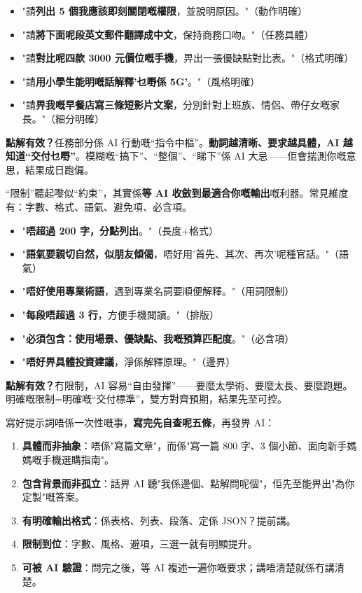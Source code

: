 \begin{itemize}
  \item "請\textbf{列出 5 個我應該即刻關閉嘅權限}，並說明原因。"（動作明確）
  \item "請\textbf{將下面呢段英文郵件翻譯成中文}，保持商務口吻。"（任務具體）
  \item "請\textbf{對比呢四款 3000 元價位嘅手機}，畀出一張優缺點對比表。"（格式明確）
  \item "請\textbf{用小學生能明嘅話解釋'乜嘢係 5G'}。"（風格明確）
  \item "請\textbf{畀我嘅早餐店寫三條短影片文案}，分別針對上班族、情侶、帶仔女嘅家長。"（細分明確）
\end{itemize}

\textbf{點解有效？}任務部分係 AI 行動嘅“指令中樞”。\textbf{動詞越清晰、要求越具體，AI 越知道“交付乜嘢”}。模糊嘅“搞下”、“整個”、“睇下”係 AI 大忌——佢會揣測你嘅意思，結果成日跑偏。


“限制”聽起嚟似“約束”，其實係\textbf{等 AI 收斂到最適合你嘅輸出}嘅利器。常見維度有：字數、格式、語氣、避免項、必含項。


\begin{itemize}
  \item "\textbf{唔超過 200 字，分點列出}。"（長度+格式）
  \item "\textbf{語氣要親切自然，似朋友傾偈}，唔好用'首先、其次、再次'呢種官話。"（語氣）
  \item "\textbf{唔好使用專業術語}，遇到專業名詞要順便解釋。"（用詞限制）
  \item "\textbf{每段唔超過 3 行}，方便手機閲讀。"（排版）
  \item "\textbf{必須包含：使用場景、優缺點、我嘅預算匹配度}。"（必含項）
  \item "\textbf{唔好畀具體投資建議}，淨係解釋原理。"（邊界）
\end{itemize}

\textbf{點解有效？}冇限制，AI 容易“自由發揮”——要麼太學術、要麼太長、要麼跑題。明確嘅限制=明確嘅“交付標準”，雙方對齊預期，結果先至可控。


寫好提示詞唔係一次性嘅事，\textbf{寫完先自查呢五條}，再發畀 AI：

\begin{enumerate}
  \item \textbf{具體而非抽象}：唔係"寫篇文章"，而係"寫一篇 800 字、3 個小節、面向新手媽媽嘅手機選購指南"。
  \item \textbf{包含背景而非孤立}：話畀 AI 聽"我係邊個、點解問呢個"，佢先至能畀出"為你定製"嘅答案。
  \item \textbf{有明確輸出格式}：係表格、列表、段落、定係 JSON？提前講。
  \item \textbf{限制到位}：字數、風格、避項，三選一就有明顯提升。
  \item \textbf{可被 AI 驗證}：問完之後，等 AI 複述一遍你嘅要求；講唔清楚就係冇講清楚。
\end{enumerate}

